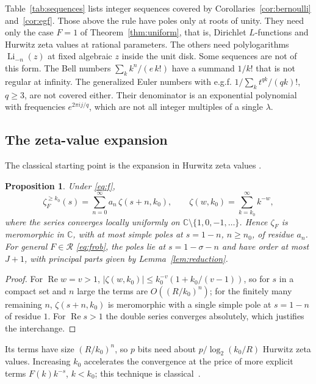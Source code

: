 \documentclass[11pt,reqno]{amsart}
\newtheorem{proposition}[theorem]{Proposition}
\theoremstyle{definition}
\theoremstyle{remark}
\newcommand{\Li}{\operatorname{Li}}
\newcommand{\Reg}{\mathcal{R}}
\newcommand{\CC}{\mathbb{C}}
\begin{document}
Table~\ref{tab:sequences} lists integer sequences covered by
Corollaries~\ref{cor:bernoulli} and~\ref{cor:egf}. Those above the rule have poles only at roots of unity. They need only the case $F = 1$ of Theorem~\ref{thm:uniform}, that is, Dirichlet $L$-functions and Hurwitz zeta
values at rational parameters. The others need polylogarithms $\Li_{-n}(z)$ at fixed algebraic $z$ inside the unit
disk. Some sequences are not of this form. The Bell numbers $\sum_kk^n/(e\,k!)$ have a summand $1/k!$ that is not
regular at infinity. The generalized Euler numbers with e.g.f. $1/\sum_kt^{qk}/(qk)!$, $q \ge 3$, are not covered
either. Their denominator is an exponential polynomial with frequencies $e^{2\pi ij/q}$, which are not all integer
multiples of a single $\lambda$.

\subsection{The zeta-value expansion}\label{sec:zetavalue}
The classical starting point is the expansion in Hurwitz zeta values \cite{FV96}.

\begin{proposition}\label{prop:cont}
Under \eqref{eq:f},
\begin{equation}\label{eq:zetavalue}
  \zeta_F^{\ge k_0}(s) = \sum_{n=0}^{\infty}a_n\,\zeta(s+n,k_0), \qquad \zeta(w,k_0) = \sum_{k=k_0}^{\infty}k^{-w},
\end{equation}
where the series converges locally uniformly on $\CC \setminus \{1, 0, -1, \dots\}$. Hence $\zeta_F$ is meromorphic
in $\CC$, with at most simple poles at $s = 1-n$, $n \ge n_0$, of residue $a_n$. For general $F \in \Reg$
\eqref{eq:frob}, the poles lie at $s = 1 - \sigma - n$ and have order at most $J+1$, with principal parts given
by Lemma~\ref{lem:reduction}.
\end{proposition}

\begin{proof}
For $\operatorname{Re}w = v > 1$, $|\zeta(w,k_0)| \le k_0^{-v}(1 + k_0/(v-1))$, so for $s$ in a compact set and
$n$ large the terms are $O((R/k_0)^n)$; for the finitely many remaining $n$, $\zeta(s+n,k_0)$ is meromorphic with a
single simple pole at $s = 1-n$ of residue $1$. For $\operatorname{Re}s > 1$ the double series converges absolutely,
which justifies the interchange.
\end{proof}

Its terms have size $(R/k_0)^n$, so $p$ bits need about $p/\log_2(k_0/R)$ Hurwitz zeta values. Increasing $k_0$ accelerates the convergence at the price of more
explicit terms $F(k)k^{-s}$, $k < k_0$; this technique is classical~\cite{FV96}.
\end{document}
